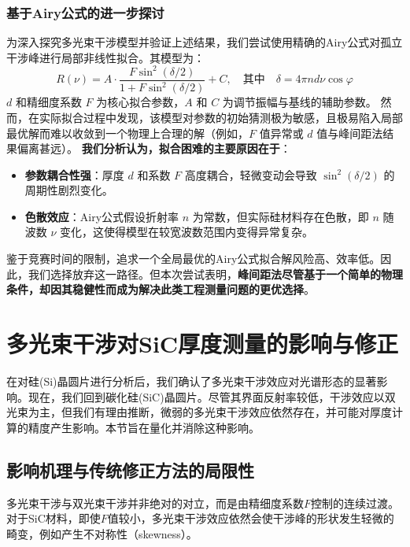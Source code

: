 \documentclass{ctexart} %
\begin{document}
\subsubsection{基于Airy公式的进一步探讨}
为深入探究多光束干涉模型并验证上述结果，我们尝试使用精确的Airy公式对孤立干涉峰进行局部非线性拟合。其模型为：
$$
    R(\nu) = A \cdot \frac{F \sin^2(\delta/2)}{1 + F \sin^2(\delta/2)} + C, \quad \text{其中} \quad \delta = 4\pi n d \nu \cos\varphi
$$
$d$ 和精细度系数 $F$ 为核心拟合参数，$A$ 和 $C$ 为调节振幅与基线的辅助参数。
然而，在实际拟合过程中发现，该模型对参数的初始猜测极为敏感，且极易陷入局部最优解而难以收敛到一个物理上合理的解（例如，$F$ 值异常或 $d$ 值与峰间距法结果偏离甚远）。
\textbf{我们分析认为，拟合困难的主要原因在于}：
\begin{itemize}
    \item \textbf{参数耦合性强}：厚度 $d$ 和系数 $F$ 高度耦合，轻微变动会导致 $\sin^2(\delta/2)$ 的周期性剧烈变化。
    \item \textbf{色散效应}：Airy公式假设折射率 $n$ 为常数，但实际硅材料存在色散，即 $n$ 随波数 $\nu$ 变化，这使得模型在较宽波数范围内变得异常复杂。
\end{itemize}
鉴于竞赛时间的限制，追求一个全局最优的Airy公式拟合解风险高、效率低。因此，我们选择放弃这一路径。但本次尝试表明，\textbf{峰间距法尽管基于一个简单的物理条件，却因其稳健性而成为解决此类工程测量问题的更优选择}。



\section{多光束干涉对SiC厚度测量的影响与修正}

在对硅(Si)晶圆片进行分析后，我们确认了多光束干涉效应对光谱形态的显著影响。现在，我们回到碳化硅(SiC)晶圆片。尽管其界面反射率较低，干涉效应以双光束为主，但我们有理由推断，微弱的多光束干涉效应依然存在，并可能对厚度计算的精度产生影响。本节旨在量化并消除这种影响。

\subsection{影响机理与传统修正方法的局限性}

多光束干涉与双光束干涉并非绝对的对立，而是由精细度系数$F$控制的连续过渡。对于SiC材料，即使$F$值较小，多光束干涉效应依然会使干涉峰的形状发生轻微的畸变，例如产生不对称性（skewness）。
\end{document}

